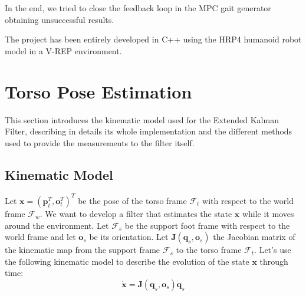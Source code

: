 \documentclass[a4paper]{article}
\begin{document}
In the end, we tried to close the feedback loop in the
MPC gait generator obtaining unsuccessful results.

The project has been entirely developed in C++ using the HRP4 humanoid robot
model in a V-REP environment.

\section{Torso Pose Estimation}
This section introduces the kinematic model used for the Extended Kalman Filter,
describing in details its whole implementation and the different methods used
to provide the measurements to the filter itself.

\subsection{Kinematic Model}
Let $\bm{x} = (\bm{p}_t^T, \bm{o}_t^T)^T$ be the pose of the torso frame $\mathcal{F}_t$
with respect to the world frame $\mathcal{F}_w$. We want to
develop a filter that estimates the state $\bm{x}$ while
it moves around the environment. Let $\mathcal{F}_s$ be the
support foot frame with respect to the world frame and let
$\bm{o}_s$ be its orientation.
Let $\bm{J}(\bm{q}_s, \bm{o}_s)$ the Jacobian
matrix of the kinematic map from the support frame
$\mathcal{F}_s$ to the torso frame $\mathcal{F}_t$.
Let's use the following kinematic model to describe the
evolution of the state $\bm{x}$ through time:
\begin{equation}
    \bm{\dot{x}} = \bm{J}(\bm{q}_s, \bm{o}_s) \bm{\dot{q}}_s
    \label{eq:hrp4-kinematic-model}
\end{equation}
\end{document}
